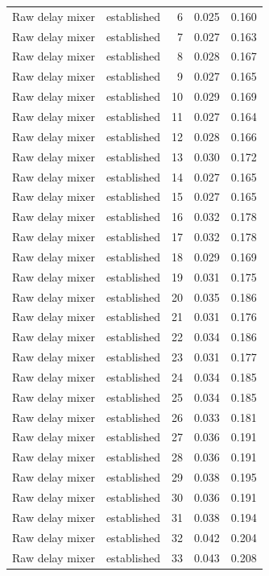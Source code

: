 \begin{tabular}{llrrr}
Raw delay mixer & established & 6 & 0.025 & 0.160 \\
Raw delay mixer & established & 7 & 0.027 & 0.163 \\
Raw delay mixer & established & 8 & 0.028 & 0.167 \\
Raw delay mixer & established & 9 & 0.027 & 0.165 \\
Raw delay mixer & established & 10 & 0.029 & 0.169 \\
Raw delay mixer & established & 11 & 0.027 & 0.164 \\
Raw delay mixer & established & 12 & 0.028 & 0.166 \\
Raw delay mixer & established & 13 & 0.030 & 0.172 \\
Raw delay mixer & established & 14 & 0.027 & 0.165 \\
Raw delay mixer & established & 15 & 0.027 & 0.165 \\
Raw delay mixer & established & 16 & 0.032 & 0.178 \\
Raw delay mixer & established & 17 & 0.032 & 0.178 \\
Raw delay mixer & established & 18 & 0.029 & 0.169 \\
Raw delay mixer & established & 19 & 0.031 & 0.175 \\
Raw delay mixer & established & 20 & 0.035 & 0.186 \\
Raw delay mixer & established & 21 & 0.031 & 0.176 \\
Raw delay mixer & established & 22 & 0.034 & 0.186 \\
Raw delay mixer & established & 23 & 0.031 & 0.177 \\
Raw delay mixer & established & 24 & 0.034 & 0.185 \\
Raw delay mixer & established & 25 & 0.034 & 0.185 \\
Raw delay mixer & established & 26 & 0.033 & 0.181 \\
Raw delay mixer & established & 27 & 0.036 & 0.191 \\
Raw delay mixer & established & 28 & 0.036 & 0.191 \\
Raw delay mixer & established & 29 & 0.038 & 0.195 \\
Raw delay mixer & established & 30 & 0.036 & 0.191 \\
Raw delay mixer & established & 31 & 0.038 & 0.194 \\
Raw delay mixer & established & 32 & 0.042 & 0.204 \\
Raw delay mixer & established & 33 & 0.043 & 0.208 \\

\end{tabular}
